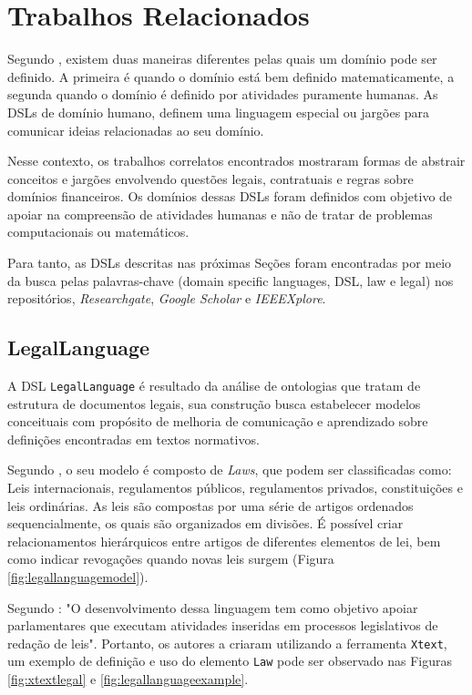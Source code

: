 \section{Trabalhos Relacionados}
\label{subsection:trabalhoscorrelatos}
 Segundo , existem duas maneiras diferentes pelas quais um domínio pode ser definido. A primeira é quando o domínio está bem definido matematicamente, a segunda quando o domínio é definido por atividades puramente humanas. As DSLs de domínio humano, definem uma linguagem especial ou jargões para comunicar ideias relacionadas ao seu domínio.  
 
 Nesse contexto, os trabalhos correlatos encontrados mostraram formas de abstrair conceitos e jargões envolvendo questões legais, contratuais e regras sobre domínios financeiros. Os domínios dessas DSLs foram definidos com objetivo de apoiar na compreensão de atividades humanas e não de tratar de problemas computacionais ou matemáticos.
 
 Para tanto, as DSLs descritas nas próximas Seções foram encontradas por meio da busca pelas palavras-chave (domain specific languages, DSL, law e legal)  nos repositórios, \textit{Researchgate}, \textit{Google Scholar} e \textit{IEEEXplore}.
 
 
\subsection{LegalLanguage}
\label{legallanguage}

A DSL \texttt{LegalLanguage} é resultado da análise de ontologias que tratam de estrutura de documentos legais, sua construção busca estabelecer modelos conceituais com propósito de melhoria de comunicação e aprendizado sobre definições encontradas em textos normativos.



Segundo , o seu modelo é composto de \textit{Laws}, que podem ser classificadas como: Leis internacionais, regulamentos públicos, regulamentos privados, constituições e leis ordinárias. As leis são compostas por uma série de artigos ordenados sequencialmente, os quais são organizados em divisões. É possível criar relacionamentos hierárquicos entre artigos de diferentes elementos de lei, bem como indicar revogações quando novas leis surgem (Figura \ref{fig:legallanguagemodel}). 

Segundo : "O desenvolvimento dessa linguagem tem como objetivo apoiar parlamentares que executam atividades inseridas em processos legislativos de redação de leis". Portanto, os autores a criaram utilizando a ferramenta \texttt{Xtext}, um exemplo de definição e uso do elemento \texttt{Law} pode ser observado nas Figuras \ref{fig:xtextlegal} e \ref{fig:legallanguageexample}.

